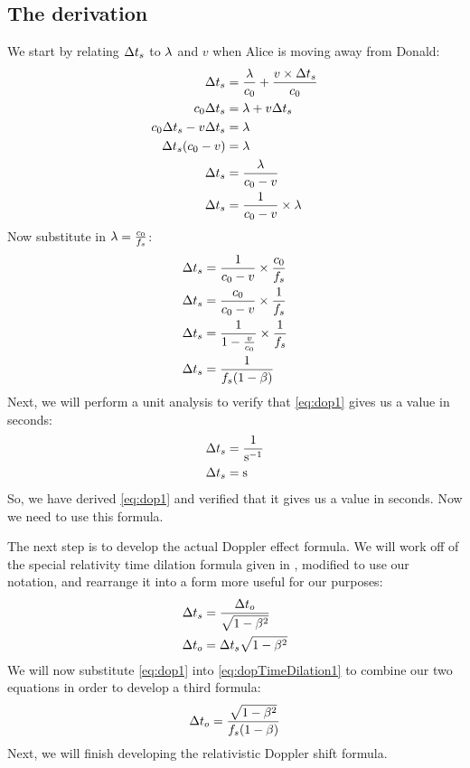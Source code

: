 	\subsection{The derivation}
		We start by relating $\mathrm{\Delta} t_s$ to $\mathrm{\lambda}$ and $v$ when Alice is moving away from Donald:
		\begin{align*}
			\Del t_s &= \frac{\lam}{\si{\clight}} + \frac{v \times \Del t_s}{\si{\clight}}\\
			\si{\clight} \Del t_s &= \lam + v\Del t_s\\
			\si{\clight} \Del t_s - v\Delta t_s &= \lam\\
			\Del t_s (\si{\clight} - v) &= \lam\\
			\Del t_s &= \frac{\lam}{\si{\clight} - v}\\
			\Del t_s &= \frac{1}{\si{\clight} - v} \times \lam
		\end{align*}
		Now substitute in $\lam = \frac{\si{\clight}}{f_s}$:
		\begin{align}
			\Del t_s &= \frac{1}{\si{\clight} - v} \times \frac{\si{\clight}}{f_s}\nonumber\\
			\Del t_s &= \frac{\si{\clight}}{\si{\clight} - v} \times \frac{1}{f_s}\nonumber\\
			\Del t_s &= \frac{1}{1 - \frac{v}{\si{\clight}}} \times \frac{1}{f_s}\nonumber\\
			\Del t_s &= \frac{1}{f_s(1 - \beta)}\label{eq:dop1}
		\end{align}
		Next, we will perform a unit analysis to verify that \eqref{eq:dop1} gives us a value in seconds:
		\begin{align*}
			\mathrm{\Delta} t_s &= \frac{1}{\si{\per\second}}\\
			\mathrm{\Delta} t_s &= \si{\second}
		\end{align*}
		So, we have derived \eqref{eq:dop1} and verified that it gives us a value in seconds.
		Now we need to use this formula.

		The next step is to develop the actual Doppler effect formula.
		We will work off of the special relativity time dilation formula given in \cite[\pno~593]{textbook}, modified to use our notation, and rearrange it into a form more useful for our purposes:
		\begin{align}
			\mathrm{\Delta} t_s &= \frac{\mathrm{\Delta} t_o}{\sqrt{1 - \beta^2}}\nonumber\\
			\mathrm{\Delta} t_o &= \mathrm{\Delta} t_s\sqrt{1 - \beta^2}\label{eq:dopTimeDilation1}
		\end{align}
		We will now substitute \eqref{eq:dop1} into \eqref{eq:dopTimeDilation1} to combine our two equations in order to develop a third formula:
		\begin{equation}\label{eq:dop3}
			\mathrm{\Delta} t_o = \frac{\sqrt{1 - \beta^2}}{f_s(1 - \beta)}
		\end{equation}
		Next, we will finish developing the relativistic Doppler shift formula.

